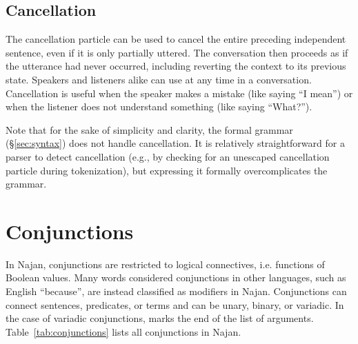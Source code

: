 


\subsection{Cancellation} \label{sec:cancellation}

The cancellation particle  can be used to cancel the entire
preceding independent sentence, even if it is only partially uttered. The
conversation then proceeds as if the utterance had never occurred, including
reverting the context to its previous state. Speakers and listeners alike can
use  at any time in a conversation. Cancellation is useful when the
speaker makes a mistake (like saying ``I mean'') or when the listener does not
understand something (like saying ``What?'').

Note that for the sake of simplicity and clarity, the formal grammar
(\S\ref{sec:syntax}) does not handle cancellation. It is relatively
straightforward for a parser to detect cancellation (e.g., by checking for an
unescaped cancellation particle during tokenization), but expressing it formally
overcomplicates the grammar.

\section{Conjunctions} \label{sec:conjunctions}

In Najan, conjunctions are restricted to logical connectives, i.e. functions of
Boolean values. Many words considered conjunctions in other languages, such as
English ``because'', are instead classified as modifiers in Najan. Conjunctions
can connect sentences, predicates, or terms and can be unary, binary, or
variadic. In the case of variadic conjunctions,  marks the end of the
list of arguments. Table~\ref{tab:conjunctions} lists all conjunctions in Najan.

